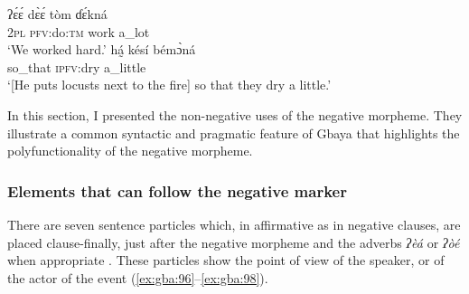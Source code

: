 \documentclass[output=paper,colorlinks=true, citecolor=brown]{langscibook}
\begin{document}

\ea\label{ex:gba:94}
    \gll ʔɛ́ɛ́ dɛ̀ɛ́ tòm ɗɛ́kná \\ 
         \textsc{2pl} \textsc{pfv}:do\textsc{:tm} work a\_lot \\
    \glt ‘We worked hard.’
\z 
\ea\label{ex:gba:95}
    \gll  há̰  késí bémɔ̀ná \\ 
         so\_that \textsc{ipfv}:dry a\_little \\
    \glt ‘[He puts locusts next to the fire] so that they dry a little.’
\z 

In this section, I presented the non-negative uses of the negative morpheme. They illustrate a common syntactic and pragmatic feature of Gbaya that highlights the polyfunctionality of the negative morpheme.

\subsubsection{Elements that can follow the negative marker}\label{sec:gba:4.6.4}

There are seven sentence particles which, in affirmative as in negative clauses, are placed clause-finally, just after the negative morpheme and the adverbs \textit{ʔèá} or \textit{ʔòé} when appropriate . These particles show the point of view of the speaker, or of the actor of the event (\ref{ex:gba:96}--\ref{ex:gba:98}).
\end{document}
